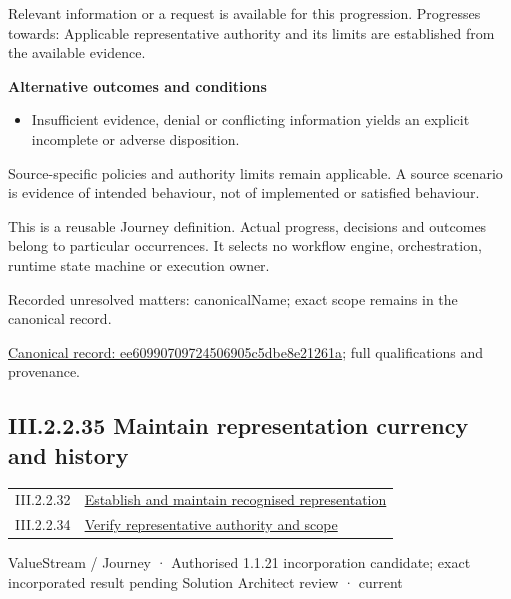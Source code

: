 Relevant information or a request is available for this progression. Progresses towards: Applicable representative authority and its limits are established from the available evidence.



\par\medskip\textbf{Alternative outcomes and conditions}\par


\begin{itemize}


\item Insufficient evidence, denial or conflicting information yields an explicit incomplete or adverse disposition.

\end{itemize}


Source-specific policies and authority limits remain applicable. A source scenario is evidence of intended behaviour, not of implemented or satisfied behaviour.



This is a reusable Journey definition. Actual progress, decisions and outcomes belong to particular occurrences. It selects no workflow engine, orchestration, runtime state machine or execution owner.


{\small Recorded unresolved matters: canonicalName; exact scope remains in the canonical record.}\par
{\footnotesize \href{../../../../../../../continuum/strategy/value-stream/ee60990709724506905c5dbe8e21261a.md}{Canonical record: ee60990709724506905c5dbe8e21261a}; full qualifications and provenance.}\par
\subsection*{III.2.2.35 Maintain representation currency and history}
\label{navigation:III.2.2.35}

\begin{longtable}{p{.22\linewidth}p{.73\linewidth}}
III.2.2.32 & \hyperref[element:45372a8e0fc64dd3ba0f2cc4b14b0ee3]{Establish and maintain recognised representation} \\
III.2.2.34 & \hyperref[element:ee60990709724506905c5dbe8e21261a]{Verify representative authority and scope} \\
\end{longtable}
\label{element:fa9998f53cd64832abe79b40904440f5}
{\small ValueStream / Journey · Authorised 1.1.21 incorporation candidate; exact incorporated result pending Solution Architect review · current}\par

